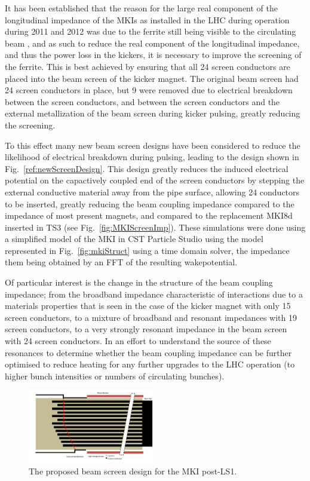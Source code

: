 \documentclass{JAC2003}
\begin{document}
It has been established that the reason for the large real component of the longitudinal impedance of the MKIs as installed in the LHC during operation during 2011 and 2012 was due to the ferrite still being visible to the circulating beam \cite{kicker_meas}, and as such to reduce the real component of the longitudinal impedance, and thus the power loss in the kickers, it is necessary to improve the screening of the ferrite. This is best achieved by ensuring that all 24 screen conductors are placed into the beam screen of the kicker magnet. The original beam screen had 24 screen conductors in place, but 9 were removed due to electrical breakdown between the screen conductors, and between the screen conductors and the external metallization of the beam screen during kicker pulsing, greatly reducing the screening. 

To this effect many new beam screen designs have been considered to reduce the likelihood of electrical breakdown during pulsing, leading to the design shown in Fig.~\ref{ref:newScreenDesign}. This design greatly reduces the induced electrical potential on the capactively coupled end of the screen conductors by stepping the external conductive material away from the pipe surface, allowing 24 conductors to be inserted, greatly reducing the beam coupling impedance compared to the impedance of most present magnets, and compared to the replacement MKI8d inserted in TS3 (see Fig.~\ref{fig:MKIScreenImp}). These simulations were done using a simplified model of the MKI in CST Particle Studio \cite{cst-cite} using the model represented in Fig.~\ref{fig:mkiStruct} using a time domain solver, the impedance them being obtained by an FFT of the resulting wakepotential. 

Of particular interest is the change in the structure of the beam coupling impedance; from the broadband impedance characteristic of interactions due to a materials properties that is seen in the case of the kicker magnet with only 15 screen conductors, to a mixture of broadband and resonant impedances with 19 screen conductors, to a very strongly resonant impedance in the beam screen with 24 screen conductors. In an effort to understand the source of these resonances to determine whether the beam coupling impedance can be further optimised to reduce heating for any further upgrades to the LHC operation (to higher bunch intensities or numbers of circulating bunches).

\begin{figure}
\includegraphics[width=0.5\textwidth]{mki-final-design.pdf}
\caption{The proposed beam screen design for the MKI post-LS1.}
\label{fig:newScreenDesign}
\end{figure}
\end{document}
